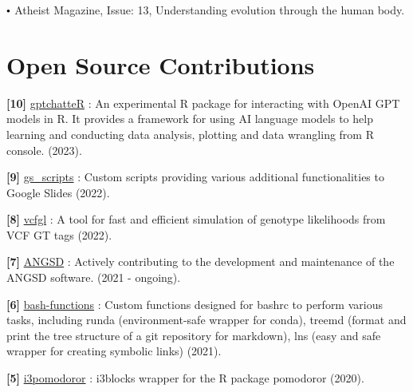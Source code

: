 \documentclass[letterpaper,10.5pt]{article}
\newcommand\sbullet[1][.5]{\mathbin{\vcenter{\hbox{\scalebox{#1}{$\bullet$}}}}}
\begin{document}
$\sbullet[.6]$ \hspace{0.74cm}  Atheist Magazine, Issue: 13, Understanding evolution through the human body. \\
\smallskip


\section{Open Source Contributions}

\textbf{[10]} \hspace{0.42cm} \href{https://github.com/isinaltinkaya/gptchatteR}{gptchatteR} : An experimental R package for interacting with OpenAI GPT models in R. It provides a framework for using AI language models to help learning and conducting data analysis, plotting and data wrangling from R console. (2023). \\
\smallskip

\textbf{[9]} \hspace{0.42cm} \href{https://github.com/isinaltinkaya/google-slides_scripts}{gs\_scripts} : Custom scripts providing various additional functionalities to Google Slides (2022). \\
\smallskip

\textbf{[8]} \hspace{0.42cm} \href{https://github.com/isinaltinkaya/vcfgl}{vcfgl} : A tool for fast and efficient simulation of genotype likelihoods from VCF GT tags (2022). \\
\smallskip

\textbf{[7]} \hspace{0.42cm} \href{https://github.com/ANGSD/angsd}{ANGSD} : Actively contributing to the development and maintenance of the ANGSD software. (2021 - ongoing).\\
\smallskip

\textbf{[6]} \hspace{0.42cm} \href{https://github.com/isinaltinkaya/bash-functions}{bash-functions} : Custom functions designed for bashrc to perform various tasks, including runda (environment-safe wrapper for conda), treemd (format and print the tree structure of a git repository for markdown), lns (easy and safe wrapper for creating symbolic links) (2021).

\textbf{[5]} \hspace{0.42cm} \href{https://github.com/isinaltinkaya/i3pomodoror}{i3pomodoror} : i3blocks wrapper for the R package pomodoror (2020). \\
\smallskip
\end{document}

